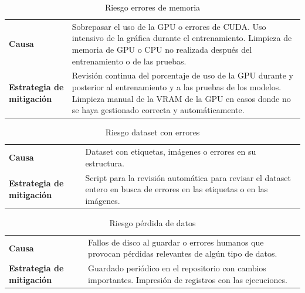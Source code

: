 \documentclass[12pt,a4paper,onecolumn,oneside]{report}
\begin{document}
\begin{table}[ht]
    \centering
    \caption{Riesgo errores de memoria}
    \begin{tabularx}{1\textwidth}{| >{\centering\arraybackslash}X | >{\centering\arraybackslash}X |}
        \hline
        \multicolumn{2}{|c|}{\textbf{R2}}\\
        \hline 
        \textbf{Causa} & Sobrepasar el uso de la GPU o errores de CUDA. Uso intensivo de la gráfica durante el entrenamiento. Limpieza de memoria de GPU o CPU no realizada después del entrenamiento o de las pruebas.\\
        \hline 
        \textbf{Estrategia de mitigación} & Revisión continua del porcentaje de uso de la GPU durante y posterior al entrenamiento y a las pruebas de los modelos. Limpieza manual de la VRAM de la GPU en casos donde no se haya gestionado correcta y automáticamente.\\
        \hline
    \end{tabularx}
    \label{R2}
\end{table}

\begin{table}[ht]
    \centering
    \caption{Riesgo dataset con errores}
    \begin{tabularx}{1\textwidth}{| >{\centering\arraybackslash}X | >{\centering\arraybackslash}X |}
        \hline
        \multicolumn{2}{|c|}{\textbf{R3}}\\
        \hline 
        \textbf{Causa} &  Dataset con etiquetas, imágenes o errores en su estructura.\\
        \hline 
        \textbf{Estrategia de mitigación} & Script para la revisión automática para revisar el dataset entero en busca de errores en las etiquetas o en las imágenes.\\
        \hline
    \end{tabularx}
    \label{R3}
\end{table}

\begin{table}[ht]
    \centering
    \caption{Riesgo pérdida de datos}
    \begin{tabularx}{1\textwidth}{| >{\centering\arraybackslash}X | >{\centering\arraybackslash}X |}
        \hline
        \multicolumn{2}{|c|}{\textbf{R4}}\\
        \hline 
        \textbf{Causa} &  Fallos de disco al guardar o errores humanos que provocan pérdidas relevantes de algún tipo de datos.\\
        \hline 
        \textbf{Estrategia de mitigación} & Guardado periódico en el repositorio con cambios importantes. Impresión de registros con las ejecuciones.\\
        \hline
    \end{tabularx}
    \label{R4}
\end{table}
\end{document}
